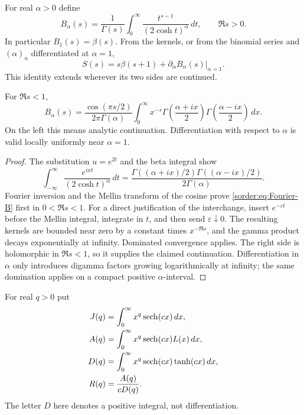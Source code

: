 For real $\alpha>0$ define
\[
 B_\alpha(s)=\frac1{\Gamma(s)}\int_0^\infty
        \frac{t^{s-1}}{(2\cosh t)^\alpha}\,dt,
 \qquad\Re s>0.
\]
In particular $B_1(s)=\beta(s)$. From the kernels, or from the
binomial series and $(\alpha)_n$ differentiated at $\alpha=1$,
\begin{equation}\label{sorder:eq:parameter-derivative}
 S(s)=s\beta(s+1)+\left.\partial_\alpha B_\alpha(s)\right|_{\alpha=1}.
\end{equation}
This identity extends wherever its two sides are continued.

\begin{lemma}\label{sorder:lem:Fourier}
For $\Re s<1$,
\begin{equation}\label{sorder:eq:Fourier-B}
 B_\alpha(s)=\frac{\cos(\pi s/2)}{2\pi\Gamma(\alpha)}
 \int_0^\infty x^{-s}
 \Gamma\left(\frac{\alpha+ix}{2}\right)
 \Gamma\left(\frac{\alpha-ix}{2}\right)\,dx.
\end{equation}
On the left this means analytic continuation. Differentiation with
respect to $\alpha$ is valid locally uniformly near $\alpha=1$.
\end{lemma}
\begin{proof}
The substitution $u=e^{2t}$ and the beta integral show
\[
 \int_{-\infty}^\infty\frac{e^{ixt}}{(2\cosh t)^\alpha}\,dt
 =\frac{\Gamma((\alpha+ix)/2)\Gamma((\alpha-ix)/2)}{2\Gamma(\alpha)}.
\]
Fourier inversion and the Mellin transform of the cosine prove
\eqref{sorder:eq:Fourier-B} first in $0<\Re s<1$. For a direct
justification of the interchange, insert $e^{-\varepsilon t}$ before
the Mellin integral, integrate in $t$, and then send
$\varepsilon\downarrow0$. The resulting kernels are bounded near
zero by a constant times $x^{-\Re s}$, and the gamma product decays
exponentially at infinity. Dominated convergence applies.
The right side is holomorphic in $\Re s<1$, so it supplies the
claimed continuation. Differentiation in $\alpha$ only introduces
digamma factors growing logarithmically at infinity; the same
domination applies on a compact positive $\alpha$-interval.
\end{proof}

For real $q>0$ put
\begin{align}
 J(q)&=\int_0^\infty x^q\operatorname{sech}(cx)\,dx,
 \label{sorder:def:J}\\
 A(q)&=\int_0^\infty x^q\operatorname{sech}(cx)L(x)\,dx,
 \label{sorder:def:A}\\
 D(q)&=\int_0^\infty x^q\operatorname{sech}(cx)\tanh(cx)\,dx,
 \label{sorder:def:D}\\
 R(q)&=\frac{A(q)}{cD(q)}.
 \label{sorder:def:R}
\end{align}
The letter $D$ here denotes a positive integral, not differentiation.

